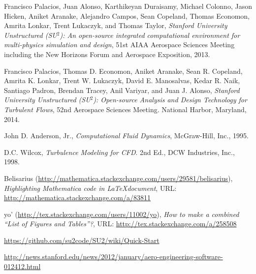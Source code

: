 \documentclass[10pt, titlepage]{article}
\begin{document}
\begin{thebibliography}{9}

Francisco Palacios, Juan Alonso, Karthikeyan Duraisamy, Michael Colonno, Jason Hicken, Aniket Aranake, Alejandro Campos, Sean Copeland, Thomas Economon, Amrita Lonkar, Trent Lukaczyk, and Thomas Taylor, \emph{Stanford University Unstructured (SU$^2$): An open-source integrated computational environment for multi-physics simulation and design}, 51st AIAA Aerospace Sciences Meeting including the New Horizons Forum and Aerospace Exposition, 2013.

Francisco Palacios, Thomas D. Economon, Aniket Aranake, Sean R. Copeland, Amrita K. Lonkar, Trent W. Lukaczyk, David E. Manosalvas, Kedar R. Naik, Santiago Padron, Brendan Tracey, Anil Variyar, and Juan J. Alonso, \emph{Stanford University Unstructured (SU$^2$): Open-source Analysis and Design Technology for Turbulent Flows}, 52nd Aerospace Sciences Meeting. National Harbor, Maryland, 2014.

John D. Anderson, Jr., \emph{Computational Fluid Dynamics}, McGraw-Hill, Inc., 1995.

D.C. Wilcox, \emph{Turbulence Modeling for CFD}. 2nd Ed., DCW Industries, Inc., 1998.

Belisarius (\url{http://mathematica.stackexchange.com/users/29581/belisarius}), \emph{Highlighting Mathematica code in \LaTeX document}, URL: \url{http://mathematica.stackexchange.com/a/83811}

yo' (\url{http://tex.stackexchange.com/users/11002/yo}), \emph{How to make a combined “List of Figures and Tables”?}, URL: \url{http://tex.stackexchange.com/a/258508}

\url{https://github.com/su2code/SU2/wiki/Quick-Start}

\url{http://news.stanford.edu/news/2012/january/aero-engineering-software-012412.html}

\end{thebibliography}
\end{document}
